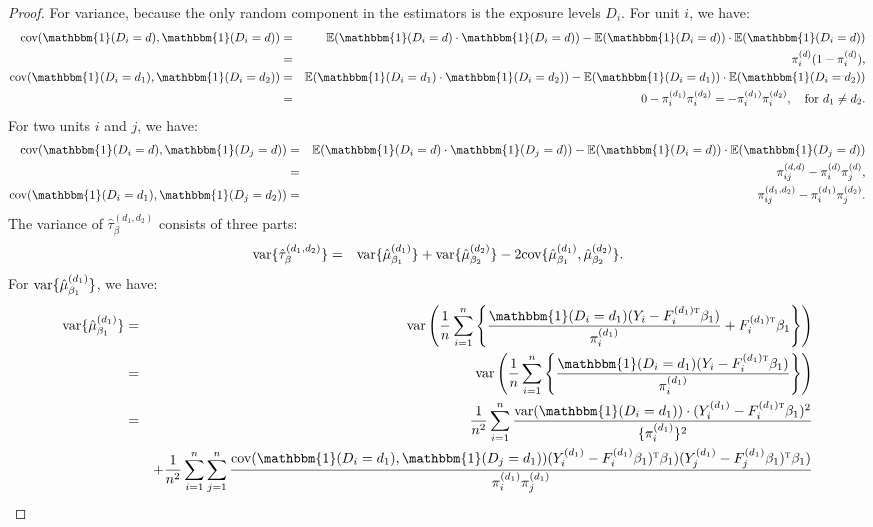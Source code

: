 \documentclass{article}
\theoremstyle{plain}
\theoremstyle{definition}
\theoremstyle{remark}
\newcommand{\E}{\mathbb{E}}
\def\T{{\textsc{t}}}
\newcommand{\cov}{\textup{cov}}
\newcommand{\var}{\textup{var}}
\newcommand{\indicator}{\mathbbm{1}}
\newcommand{\sumi}{\sum_{i=1}^n}
\newcommand{\sumij}{\sum_{i=1}^{n} \sum_{j=1}^{n}}
\begin{document}
\begin{proof}
    For variance, because the only random component in the estimators is the exposure levels $D_i$. For unit $i$, we have:
    \begin{eqnarray*}
        \cov(\indicator(D_i=d), \indicator(D_i=d)) &=& \E(\indicator(D_i=d) \cdot \indicator(D_i=d)) - \E(\indicator(D_i=d)) \cdot \E(\indicator(D_i=d)) \\
        &=& \pi_i^{(d)}(1 - \pi_i^{(d)}), \\
        \cov(\indicator(D_i=d_1), \indicator(D_i=d_2)) &=& \E(\indicator(D_i=d_1) \cdot \indicator(D_i=d_2)) - \E(\indicator(D_i=d_1)) \cdot \E(\indicator(D_i=d_2)) \\
        &=& 0 - \pi_i^{(d_1)}\pi_i^{(d_2)} = - \pi_i^{(d_1)}\pi_i^{(d_2)}, \quad \text{for } d_1\neq d_2.   
    \end{eqnarray*}    
    For two units $i$ and $j$, we have:
    \begin{eqnarray*}
        \cov(\indicator(D_i=d), \indicator(D_j=d)) &=& \E(\indicator(D_i=d) \cdot \indicator(D_j=d)) - \E(\indicator(D_i=d)) \cdot \E(\indicator(D_j=d)) \\
        &=& \pi_{ij}^{(d,d)} - \pi_i^{(d)}\pi_j^{(d)}, \\
        \cov(\indicator(D_i=d_1), \indicator(D_j=d_2)) &=& \pi_{ij}^{(d_1,d_2)} - \pi_i^{(d_1)}\pi_j^{(d_2)} . 
    \end{eqnarray*}    
    The variance of $\hat\tau^{(d_1, d_2)}_{\beta}$ consists of three parts:
    \begin{eqnarray*}
        \var\{\hat\tau^{(d_1, d_2)}_{\beta}\} &=& \var\{\hat\mu^{(d_1)}_{\beta_1}\} + \var\{\hat\mu^{(d_2)}_{\beta_2}\} - 2\cov\{\hat\mu^{(d_1)}_{\beta_1}, \hat\mu^{(d_2)}_{\beta_2}\}.
    \end{eqnarray*}
    For $\var\{\hat\mu^{(d_1)}_{\beta_1}\}$, we have:
    \begin{eqnarray*}
        \var\{\hat\mu^{(d_1)}_{\beta_1}\} &=& \var\left(\frac{1}{n}\sumi \left\{ \frac{\indicator(D_i=d_1)(Y_i-F_i^{(d_1)\T} \beta_1)}{\pi_i^{(d_1)}} + F_i^{(d_1)\T}\beta_1 \right\}\right) \\
        &=& \var\left(\frac{1}{n}\sumi \left\{ \frac{\indicator(D_i=d_1)(Y_i-F_i^{(d_1)\T} \beta_1)}{\pi_i^{(d_1)}} \right\}\right)\\
        &=& \frac{1}{n^2} \sumi \frac{\var(\indicator(D_i = d_1)) \cdot (Y_i^{(d_1)} - F_i^{(d_1)\T}\beta_1)^2}{\{\pi_i^{(d_1)}\}^2}\\
        &&  + \frac{1}{n^2} \sumij \frac{\cov(\indicator(D_i=d_1), \indicator(D_j=d_1)) (Y_i^{(d_1)} - F_i^{(d_1)}\beta_1)^{\T} \beta_1)(Y_j^{(d_1)} - F_j^{(d_1)}\beta_1)^{\T} \beta_1)}{\pi_i^{(d_1)}\pi_j^{(d_1)}} \\

\end{eqnarray*}
\end{proof}
\end{document}
